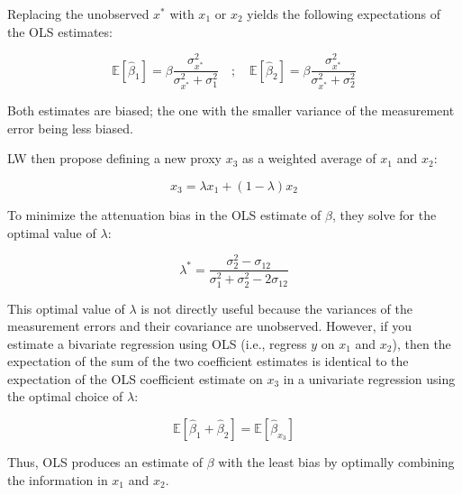 \documentclass[12pt,english]{article}
\begin{document}
\begin{appendices}
Replacing the unobserved \(x^*\) with \(x_1\) or \(x_2\) yields the following expectations of the OLS estimates:

\[
\mathbb{E} \left[ \hat{\beta}_1 \right] = \beta \frac{\sigma_{x^*}^2}{\sigma_{x^*}^2 + \sigma_1^2} \quad ; \quad \mathbb{E} \left[ \hat{\beta}_2 \right] = \beta \frac{\sigma_{x^*}^2}{\sigma_{x^*}^2 + \sigma_2^2}
\]

Both estimates are biased; the one with the smaller variance of the measurement error being less biased.

LW then propose defining a new proxy \(x_3\) as a weighted average of \(x_1\) and \(x_2\):

\[
x_3 = \lambda x_1 + (1 - \lambda) x_2
\]

To minimize the attenuation bias in the OLS estimate of \(\beta\), they solve for the optimal value of \(\lambda\):

\[
\lambda^* = \frac{\sigma_2^2 - \sigma_{12}}{\sigma_1^2 + \sigma_2^2 - 2\sigma_{12}}
\]

This optimal value of \(\lambda\) is not directly useful because the variances of the measurement errors and their covariance are unobserved. However, if you estimate a bivariate regression using OLS (i.e., regress \(y\) on \(x_1\) and \(x_2\)), then the expectation of the sum of the two coefficient estimates is identical to the expectation of the OLS coefficient estimate on \(x_3\) in a univariate regression using the optimal choice of \(\lambda\):

\[
\mathbb{E} \left[ \hat{\beta}_1 + \hat{\beta}_2 \right] = \mathbb{E} \left[ \hat{\beta}_{x_3} \right]
\]

Thus, OLS produces an estimate of \(\beta\) with the least bias by optimally combining the information in \(x_1\) and \(x_2\).



\end{appendices}
\end{document}

